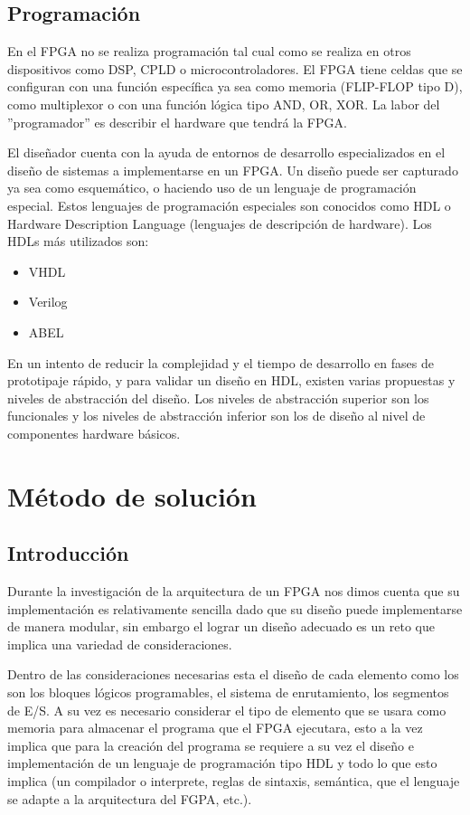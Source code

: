 \documentclass[12pt]{article}
\begin{document}
\subsection{Programación}

En el FPGA no se realiza programación tal cual como se realiza en otros dispositivos como DSP, CPLD o microcontroladores. El FPGA tiene celdas que se configuran con una función específica ya sea como memoria (FLIP-FLOP tipo D), como multiplexor o con una función lógica tipo AND, OR, XOR. La labor del ''programador'' es describir el hardware que tendrá la FPGA. 

El diseñador cuenta con la ayuda de entornos de desarrollo especializados en el diseño de sistemas a implementarse en un FPGA. Un diseño puede ser capturado ya sea como esquemático, o haciendo uso de un lenguaje de programación especial. Estos lenguajes de programación especiales son conocidos como HDL o Hardware Description Language (lenguajes de descripción de hardware). Los HDLs más utilizados son:

\begin{itemize}
  \item VHDL
  \item Verilog
  \item ABEL
\end{itemize}

En un intento de reducir la complejidad y el tiempo de desarrollo en fases de prototipaje rápido, y para validar un diseño en HDL, existen varias propuestas y niveles de abstracción del diseño. Los niveles de abstracción superior son los funcionales y los niveles de abstracción inferior son los de diseño al nivel de componentes hardware básicos.

\section{Método de solución}

\subsection{Introducción}

Durante la investigación de la arquitectura de un FPGA nos dimos cuenta que su implementación es relativamente sencilla dado que su diseño puede implementarse de manera modular, sin embargo el lograr un diseño adecuado es un reto que implica una variedad de consideraciones.  

Dentro de las consideraciones necesarias esta el diseño de cada elemento como los son los bloques lógicos programables, el sistema de enrutamiento, los segmentos de E/S. A su vez es necesario considerar el tipo de elemento que se usara como memoria para almacenar el programa que el FPGA ejecutara, esto a la vez implica que para la creación del programa se requiere a su vez el diseño e implementación de un lenguaje de programación tipo HDL y todo lo que esto implica (un compilador o interprete, reglas de sintaxis, semántica, que el lenguaje se adapte a la arquitectura del FGPA, etc.). 
 
\end{document}
